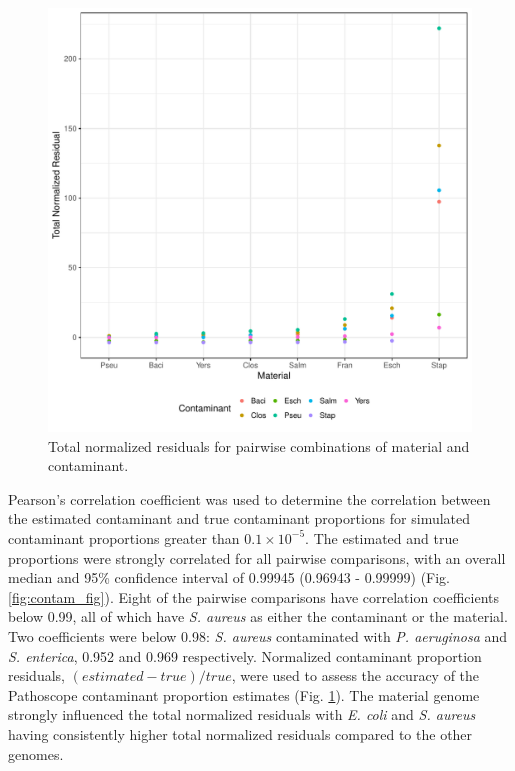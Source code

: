 \documentclass[fleqn,10pt,lineno]{wlpeerj}\usepackage[]{graphicx}\usepackage[]{color}
\makeatletter
\def\maxwidth{ %
  \ifdim\Gin@nat@width>\linewidth
    \linewidth
  \else
    \Gin@nat@width
  \fi
}
\newenvironment{knitrout}{}{} %
\makeatother
\begin{document}
\begin{knitrout}
\color{fgcolor}\begin{figure}
\includegraphics[width=\maxwidth]{figure/contam_resid-1} \caption[Total normalized residuals for pairwise combinations of material and contaminant]{Total normalized residuals for pairwise combinations of material and contaminant.}\label{fig:contam_resid}
\end{figure}


\end{knitrout}


Pearson's correlation coefficient was used to determine the correlation between the estimated contaminant and true contaminant proportions for simulated contaminant proportions greater than $0.1 \times 10^{-5}$.
The estimated and true proportions were strongly correlated for all pairwise comparisons, with an overall median and 95\% confidence interval of 0.99945 (0.96943 - 0.99999) (Fig. \ref{fig:contam_fig}).
Eight of the pairwise comparisons have correlation coefficients below 0.99, all of which have \textit{S. aureus} as either the contaminant or the material.
Two coefficients were below 0.98: \textit{S. aureus} contaminated with \textit{P. aeruginosa} and \textit{S. enterica}, 0.952 and 0.969 respectively.
Normalized contaminant proportion residuals, $(estimated-true)/true$, were used to assess the accuracy of the Pathoscope contaminant proportion estimates (Fig. \ref{fig:contam_resid}).
The material genome strongly influenced the total normalized residuals with \textit{E. coli} and \textit{S. aureus} having consistently higher total normalized residuals compared to the other genomes.
\end{document}
